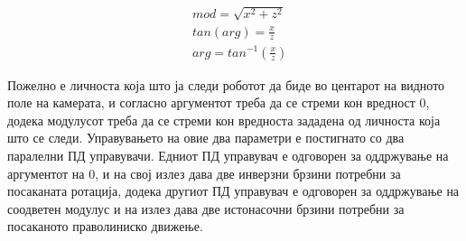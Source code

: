 \documentclass[11pt]{article}
\begin{document}
      \begin{align}
        \label{eq:cart2pol}
    	   & mod = \sqrt{x^{2} + z^{2}} \\
         & tan(arg) = \frac{x}{z} \\
         & arg = tan^{-1}(\frac{x}{z})
      \end{align}

      Пожелно е личноста која што ја следи роботот да биде во центарот на видното поле на камерата, и согласно аргументот треба да се стреми кон вредност 0, додека модулусот треба да се стреми кон вредноста зададена од личноста која што се следи. Управувањето на овие два параметри е постигнато со два паралелни ПД управувачи. Едниот ПД управувач е одговорен за оддржување на аргументот на 0, и на свој излез дава две инверзни брзини потребни за посаканата ротација, додека другиот ПД управувач е одговорен за оддржување на соодветен модулус и на излез дава две истонасочни брзини потребни за посаканото праволиниско движење.
\end{document}
